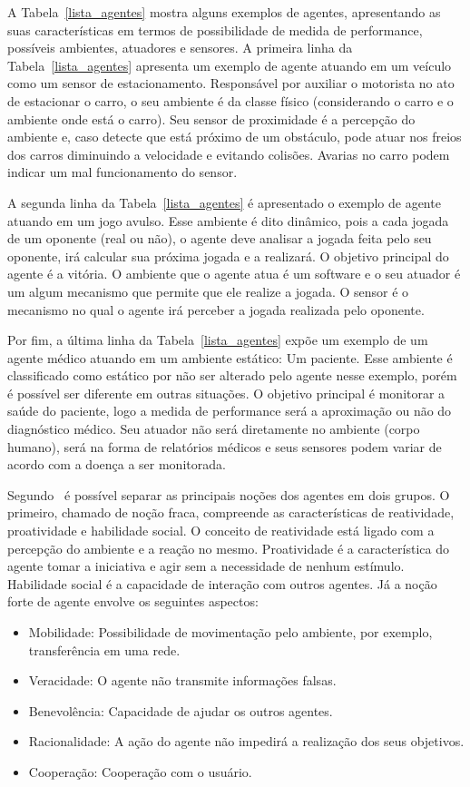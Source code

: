 A Tabela~\ref{lista_agentes} mostra alguns exemplos de agentes, apresentando as suas características em termos de possibilidade de medida de performance, possíveis ambientes, atuadores e sensores. A primeira linha da Tabela~\ref{lista_agentes} apresenta um exemplo de agente atuando em um veículo como um sensor de estacionamento. Responsável por auxiliar o motorista no ato de estacionar o carro, o seu ambiente é da classe físico (considerando o carro e o ambiente onde está o carro). Seu sensor de proximidade é a percepção do ambiente e, caso detecte que está próximo de um obstáculo, pode atuar nos freios dos carros diminuindo a velocidade e evitando colisões. Avarias no carro podem indicar um mal funcionamento do sensor.

A segunda linha da Tabela~\ref{lista_agentes} é apresentado o exemplo de agente atuando em um jogo avulso. Esse ambiente é dito dinâmico, pois a cada jogada de um oponente (real ou não), o agente deve analisar a jogada feita pelo seu oponente, irá calcular sua próxima jogada e a realizará. O objetivo principal do agente é a vitória. O ambiente que o agente atua é um software e o seu atuador é um algum mecanismo que permite que ele realize a jogada. O sensor é o mecanismo no qual o agente irá perceber a jogada realizada pelo oponente.

Por fim, a última linha da Tabela~\ref{lista_agentes} expõe um exemplo de um agente médico atuando em um ambiente estático: Um paciente. Esse ambiente é classificado como estático por não ser alterado pelo agente nesse exemplo, porém é possível ser diferente em outras situações. O objetivo principal é monitorar a saúde do paciente, logo a medida de performance será a aproximação ou não do diagnóstico médico. Seu atuador não será diretamente no ambiente (corpo humano), será na forma de relatórios médicos e seus sensores podem variar de acordo com a doença a ser monitorada.

Segundo~\cite{wooldridge04} é possível separar as principais noções dos agentes em dois grupos. O primeiro, chamado de noção fraca, compreende as características de reatividade, proatividade e habilidade social. O conceito de reatividade está ligado com a percepção do ambiente e a reação no mesmo. Proatividade é a característica do agente tomar a iniciativa e agir sem a necessidade de nenhum estímulo. Habilidade social é a capacidade de interação com outros agentes. Já a noção forte de agente envolve os seguintes aspectos:

\begin{itemize}
	\item Mobilidade: Possibilidade de movimentação pelo ambiente, por exemplo, transferência em uma rede.
	\item Veracidade: O agente não transmite informações falsas.
	\item Benevolência: Capacidade de ajudar os outros agentes.
	\item Racionalidade: A ação do agente não impedirá a realização dos seus objetivos.
	\item Cooperação: Cooperação com o usuário.
\end{itemize}

